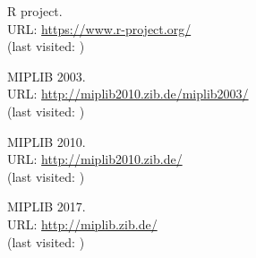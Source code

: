 \documentclass[a4paper,12pt]{book}
\begin{document}
\begin{thebibliography}{9}
	 R project. \\ URL: \url{https://www.r-project.org/} \\ (last visited: )

	 MIPLIB 2003. \\ URL: \url{http://miplib2010.zib.de/miplib2003/} \\ (last visited: )

	 MIPLIB 2010. \\ URL: \url{http://miplib2010.zib.de/} \\ (last visited: )

	 MIPLIB 2017. \\ URL: \url{http://miplib.zib.de/} \\ (last visited: )
	
\end{thebibliography}
\end{document}
